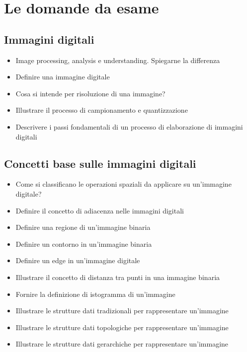 \chapter{Le domande da esame}

\section{Immagini digitali}
\begin{itemize}
	\item Image processing, analysis e understanding. Spiegarne la differenza
	\item Definire una immagine digitale
	\item Cosa si intende per risoluzione di una immagine?
	\item Illustrare il processo di campionamento e quantizzazione
	\item Descrivere i passi fondamentali di un processo di elaborazione di immagini digitali
\end{itemize}

\section{Concetti base sulle immagini digitali}
\begin{itemize}
	\item Come si classificano le operazioni spaziali da applicare su un’immagine digitale?
	\item Definire il concetto di adiacenza nelle immagini digitali
	\item Definire una regione di un’immagine binaria
	\item Definire un contorno in un’immagine binaria
	\item Definire un edge in un’immagine digitale
	\item Illustrare il concetto di distanza tra punti in una immagine binaria
	\item Fornire la definizione di istogramma di un’immagine
	\item Illustrare le strutture dati tradizionali per rappresentare un’immagine
	\item Illustrare le strutture dati topologiche per rappresentare un’immagine
	\item Illustrare le strutture dati gerarchiche per rappresentare un’immagine
\end{itemize}

